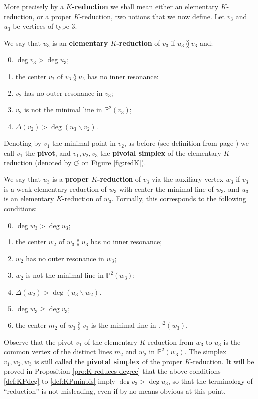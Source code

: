 \documentclass[reqno,oneside,11pt]{amsart}
\theoremstyle{plain}
\theoremstyle{definition}
\newcommand{\p}{\mathbb{P}}
\renewcommand{\ne}{\between}
\newcommand{\lines}[1]{\p^2(#1)}
\renewcommand{\ge}{\geqslant}
\begin{document}
More precisely by a \textbf{$K$-reduction} we shall mean either an elementary
$K$-reduction, or a proper $K$-reduction, two notions that we now define.
Let $v_3$ and $u_3$ be vertices of type 3.

We say that $u_3$ is an \textbf{elementary $K$-reduction} of $v_3$ if $u_3 \ne v_3$ and:
\begin{enumerate}[(K$1$)]
\setcounter{enumi}{-1}
\item\label{def:Kdeg} $\deg v_3 > \deg u_3$;
\item\label{def:Kinn} the center $v_2$ of $v_3 \ne u_3$ has no inner resonance;
\item\label{def:Kout} $v_2$ has no outer resonance in $v_3$;
\item\label{def:Kmin} $v_2$ is not the minimal line in $\lines{v_3}$;
\item\label{def:Kdel} $\Delta(v_2) > \deg (u_3 \smallsetminus v_2 )$.
\end{enumerate}
Denoting by $v_1$ the minimal point in $v_2$, as before (see definition from page \pageref{def:pivot}) we call $v_1$ the \textbf{pivot}, and $v_1, v_2, v_3$ the \textbf{pivotal simplex} of the elementary $K$-reduction (denoted by $\circlearrowleft$ on Figure \ref{fig:redK}).

We say that $u_3$ is a \textbf{proper $K$-reduction} of $v_3$ via the auxiliary vertex $w_3$ if $v_3$ is a weak elementary reduction of $w_3$ with center the minimal line of $w_3$, and $u_3$ is an elementary $K$-reduction of $w_3$.
Formally, this corresponds to the following conditions:
\begin{enumerate}[(K$1'$)]
\setcounter{enumi}{-1}
\item\label{def:KPdeg} $\deg w_3 > \deg u_3$;
\item\label{def:KPinn} the center $w_2$ of $w_3 \ne u_3$  has no inner resonance;
\item\label{def:KPout} $w_2$ has no outer resonance in $w_3$;
\item\label{def:KPmin} $w_2$ is not the minimal line in $\lines{w_3}$;
\item\label{def:KPdel} $\Delta(w_2) > \deg (u_3 \smallsetminus w_2 )$.
\item\label{def:KPdegbis} $\deg w_3 \ge \deg v_3$;
\item\label{def:KPminbis} the center $m_2$ of $w_3 \ne v_3$ is the minimal line in $\lines{w_3}$.
\end{enumerate}
Observe that the pivot $v_1$ of the elementary $K$-reduction from $w_3$ to $u_3$ is the common vertex of the distinct lines $m_2$ and $w_2$ in $\lines{w_3}$.
The simplex $v_1, w_2, w_3$ is still called the \textbf{pivotal simplex} of the proper $K$-reduction.
It will be proved in Proposition \ref{pro:K reduces degree} that the above conditions \ref{def:KPdeg} to \ref{def:KPminbis} imply $\deg v_3 > \deg u_3$, so that the terminology of ``reduction'' is not misleading, even if by no means obvious at this point.
\end{document}
